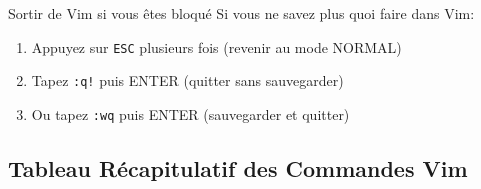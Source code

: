 \documentclass[10pt,a4paper]{article}
\begin{document}
\begin{warningbox}{Sortir de Vim si vous êtes bloqué}
Si vous ne savez plus quoi faire dans Vim:
\begin{enumerate}
\item Appuyez sur \texttt{ESC} plusieurs fois (revenir au mode NORMAL)
\item Tapez \texttt{:q!} puis ENTER (quitter sans sauvegarder)
\item Ou tapez \texttt{:wq} puis ENTER (sauvegarder et quitter)
\end{enumerate}
\end{warningbox}

\subsection{Tableau Récapitulatif des Commandes Vim}
\end{document}
